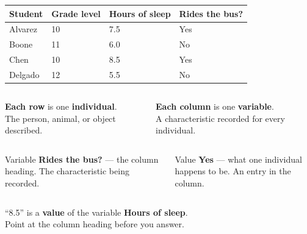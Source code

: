 \documentclass[aspectratio=169, 11pt]{beamer}
\begin{document}
\begin{frame}[t, plain]
  \vspace{2pt}
  \renewcommand{\arraystretch}{1.3}
  \begin{tabularx}{\textwidth}{@{} l Y Y Y @{}}
    \textbf{Student} & \textbf{Grade level} & \textbf{Hours of sleep} & \textbf{Rides the bus?} \\
    \hline
    Alvarez & 10 & 7.5 & Yes \\
    Boone   & 11 & 6.0 & No  \\
    Chen    & 10 & 8.5 & Yes \\
    Delgado & 12 & 5.5 & No  \\
    \hline
  \end{tabularx}
  \vspace{12pt}
  \begin{columns}[t]
    \begin{column}{0.48\textwidth}
      \textbf{\color{navy}Each row} is one \textbf{individual}.\\[4pt]
      {\small The person, animal, or object described.}
    \end{column}
    \begin{column}{0.48\textwidth}
      \textbf{\color{navy}Each column} is one \textbf{variable}.\\[4pt]
      {\small A characteristic recorded for every individual.}
    \end{column}
  \end{columns}
\end{frame}

\begin{frame}[t, plain]
  \vspace{6pt}
  \begin{columns}[t]
    \begin{column}{0.46\textwidth}
      \begin{block}{Variable}
        \textbf{Rides the bus?} --- the column heading. The characteristic being recorded.
      \end{block}
    \end{column}
    \begin{column}{0.46\textwidth}
      \begin{block}{Value}
        \textbf{Yes} --- what one individual happens to be. An entry in the column.
      \end{block}
    \end{column}
  \end{columns}
  \vspace{14pt}
  \begin{center}
    {\large ``8.5'' is a \textbf{value} of the variable \textbf{Hours of sleep}.}\\[8pt]
    {\small\color{slate} Point at the column heading before you answer.}
  \end{center}
\end{frame}
\end{document}
